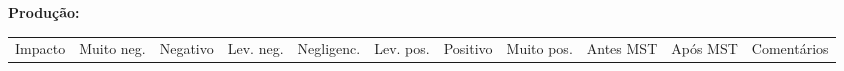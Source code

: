 \textbf{Produção:}

{
\begin{longtable}[]{@{}
  >{\raggedright\arraybackslash}p{}
  >{\centering\arraybackslash}p{}
  >{\centering\arraybackslash}p{}
  >{\centering\arraybackslash}p{}
  >{\centering\arraybackslash}p{}
  >{\centering\arraybackslash}p{}
  >{\centering\arraybackslash}p{}
  >{\centering\arraybackslash}p{}
  >{\centering\arraybackslash}p{}
  >{\centering\arraybackslash}p{}
  >{\raggedright\arraybackslash}p{}@{}}
\toprule\noalign{}
\begin{minipage}[b]{\linewidth}\raggedright
Impacto
\end{minipage} & \begin{minipage}[b]{\linewidth}\centering
Muito neg.
\end{minipage} & \begin{minipage}[b]{\linewidth}\centering
Negativo
\end{minipage} & \begin{minipage}[b]{\linewidth}\centering
Lev. neg.
\end{minipage} & \begin{minipage}[b]{\linewidth}\centering
Negligenc.
\end{minipage} & \begin{minipage}[b]{\linewidth}\centering
Lev. pos.
\end{minipage} & \begin{minipage}[b]{\linewidth}\centering
Positivo
\end{minipage} & \begin{minipage}[b]{\linewidth}\centering
Muito pos.
\end{minipage} & \begin{minipage}[b]{\linewidth}\centering
Antes MST
\end{minipage} & \begin{minipage}[b]{\linewidth}\centering
Após MST
\end{minipage} & \begin{minipage}[b]{\linewidth}\raggedright
Comentários
\end{minipage} \\

\end{longtable}}
